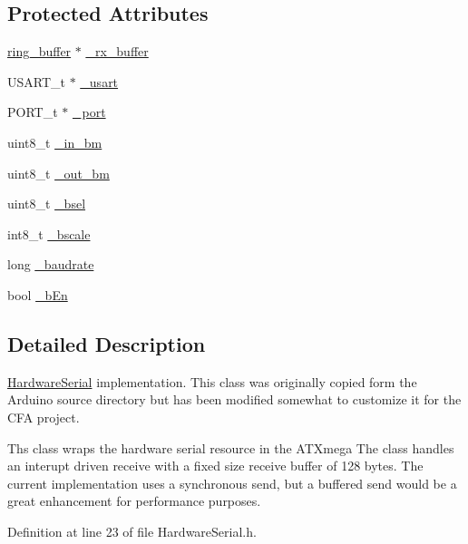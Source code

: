 \subsection*{Protected Attributes}
\begin{DoxyCompactItemize}
\item 
\hyperlink{structring__buffer}{ring\_\-buffer} $\ast$ \hyperlink{class_hardware_serial_a9ee5f8b61e049f98dfd0b5ae53e97273}{\_\-rx\_\-buffer}
\item 
USART\_\-t $\ast$ \hyperlink{class_hardware_serial_a3a3bd56aa561ae7e1eb1fd252b5b69a0}{\_\-usart}
\item 
PORT\_\-t $\ast$ \hyperlink{class_hardware_serial_add54c7d986c6122e8e8c23303f5b4845}{\_\-port}
\item 
uint8\_\-t \hyperlink{class_hardware_serial_a8724fdfd3955eeff5d3ed535624ce79a}{\_\-in\_\-bm}
\item 
uint8\_\-t \hyperlink{class_hardware_serial_a751a284e15af72b026143a8091be1b70}{\_\-out\_\-bm}
\item 
uint8\_\-t \hyperlink{class_hardware_serial_acc6c13c76a56c8b4bb88c3385b7bc791}{\_\-bsel}
\item 
int8\_\-t \hyperlink{class_hardware_serial_a37dd406c01fd6432618925f0aeb329f3}{\_\-bscale}
\item 
long \hyperlink{class_hardware_serial_ae692ab4a0a8aad73c74a10066fa9da24}{\_\-baudrate}
\item 
bool \hyperlink{class_hardware_serial_a8040fbab1f9197a9935df23a4c5e9a3b}{\_\-bEn}
\end{DoxyCompactItemize}


\subsection{Detailed Description}
\hyperlink{class_hardware_serial}{HardwareSerial} implementation. This class was originally copied form the Arduino source directory but has been modified somewhat to customize it for the CFA project.

Ths class wraps the hardware serial resource in the ATXmega The class handles an interupt driven receive with a fixed size receive buffer of 128 bytes. The current implementation uses a synchronous send, but a buffered send would be a great enhancement for performance purposes. 

Definition at line 23 of file HardwareSerial.h.



